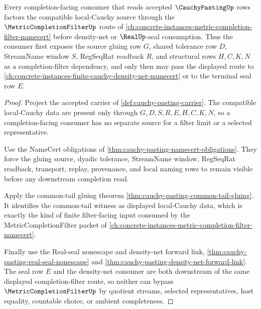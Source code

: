 \begin{theorem}
\label{thm:cauchy-pasting-metric-completion-filter-route}
Every completion-facing consumer that reads accepted $\CauchyPastingUp$ rows factors the compatible local-Cauchy source through the $\MetricCompletionFilterUp$ route of \autoref{ch:concrete-instances-metric-completion-filter-namecert} before density-net or $\RealUp$-seal consumption. Thus the consumer first exposes the source gluing row $G$, shared tolerance row $D$, StreamName window $S$, RegSeqRat readback $R$, and structural rows $H,C,K,N$ as a completion-filter dependency, and only then may pass the displayed route to \autoref{ch:concrete-instances-finite-cauchy-density-net-namecert} or to the terminal seal row $E$.
\end{theorem}
\begin{proof}
Project the accepted carrier of \autoref{def:cauchy-pasting-carrier}. The compatible local-Cauchy data are present only through $G,D,S,R,E,H,C,K,N$, so a completion-facing consumer has no separate source for a filter limit or a selected representative.

Use the NameCert obligations of \autoref{thm:cauchy-pasting-namecert-obligations}. They force the gluing source, dyadic tolerance, StreamName window, RegSeqRat readback, transport, replay, provenance, and local naming rows to remain visible before any downstream completion read.

Apply the common-tail gluing theorem \autoref{thm:cauchy-pasting-common-tail-gluing}. It identifies the common-tail witness as displayed local-Cauchy data, which is exactly the kind of finite filter-facing input consumed by the MetricCompletionFilter packet of \autoref{ch:concrete-instances-metric-completion-filter-namecert}.

Finally use the Real-seal nonescape and density-net forward link, \autoref{thm:cauchy-pasting-real-seal-nonescape} and \autoref{thm:cauchy-pasting-density-net-forward-link}. The seal row $E$ and the density-net consumer are both downstream of the same displayed completion-filter route, so neither can bypass $\MetricCompletionFilterUp$ by quotient streams, selected representatives, host equality, countable choice, or ambient completeness.
\end{proof}


